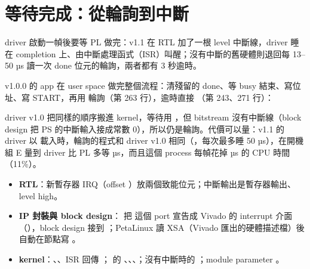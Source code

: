 \section{等待完成：從輪詢到中斷}
\label{sec:irq}

\begin{oneline}
driver 啟動一幀後要等 PL 做完：v1.1 在 RTL 加了一根 level 中斷線，driver 睡在 completion 上、由中斷處理函式（ISR）叫醒；沒有中斷的舊硬體則退回每 13--50 µs 讀一次 done 位元的輪詢，兩者都有 3 秒逾時。
\end{oneline}

\begin{before}
v1.0.0 的 app 在 user space 做完整個流程：清殘留的 done、等 busy 結束、寫位址、寫 START，再用  輪詢（第 263 行），逾時直接 （第 243、271 行）：


driver v1.0 把同樣的順序搬進 kernel，等待用 ，但 bitstream 沒有中斷線（block design 把 PS 的中斷輸入接成常數 0），所以仍是輪詢。代價可以量：v1.1 的 driver 以  載入時，輪詢的程式和 driver v1.0 相同（，每次最多睡 50 µs），在開機組 E 量到 driver 比 PL 多等 \pollWaitUs{} µs，而且這個 process 每幀花掉 \pollCpuUs{} µs 的 CPU 時間（11\%）。
\end{before}

\begin{tech}
\begin{itemize}
\item \textbf{RTL}：新暫存器 IRQ（offset ）放兩個致能位元；中斷輸出是暫存器輸出、level high。
\item \textbf{IP 封裝與 block design}： 把  這個 port 宣告成 Vivado 的 interrupt 介面（），block design 接到 ；PetaLinux 讀 XSA（Vivado 匯出的硬體描述檔）後自動在節點寫 。
\item \textbf{kernel}：、、ISR 回傳 ； 的 、、、；沒有中斷時的 ；module parameter 。
\end{itemize}
\end{tech}

